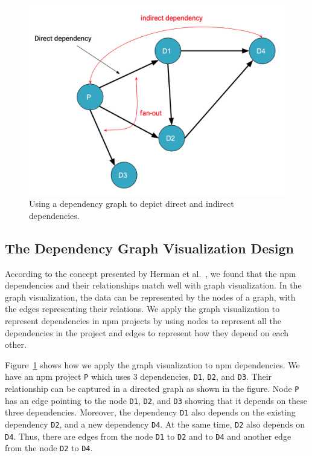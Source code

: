 \documentclass[conference]{IEEEtran}
\begin{document}
	\begin{figure}
		\centering
		\includegraphics[width=0.9\linewidth]{Figures/Viz-concept-2}
		\caption{Using a dependency graph to depict direct and indirect dependencies.}
		\label{fig:viz-concept-2}
	\end{figure}
	
	\subsection{The Dependency Graph Visualization Design}
	According to the concept presented by Herman et al.~\cite{Herman2000}, we found that the npm dependencies and their relationships match well with graph visualization. In the graph visualization, the data can be represented by the nodes of a graph, with the edges representing their relations. We apply the graph visualization to represent dependencies in npm projects by using nodes to represent all the dependencies in the project and edges to represent how they depend on each other.
	
	Figure~\ref{fig:viz-concept-2} shows how we apply the graph visualization to npm dependencies. We have an npm project \texttt{P} which uses 3 dependencies, \texttt{D1}, \texttt{D2}, and \texttt{D3}. Their relationship can be captured in a directed graph as shown in the figure. Node \texttt{P} has an edge pointing to the node \texttt{D1}, \texttt{D2}, and \texttt{D3} showing that it depends on these three dependencies. Moreover, the dependency \texttt{D1} also depends on the existing dependency \texttt{D2}, and a new dependency \texttt{D4}. At the same time, \texttt{D2} also depends on \texttt{D4}. Thus, there are edges from the node \texttt{D1} to \texttt{D2} and to \texttt{D4} and another edge from the node \texttt{D2} to \texttt{D4}. 
	
\end{document}

